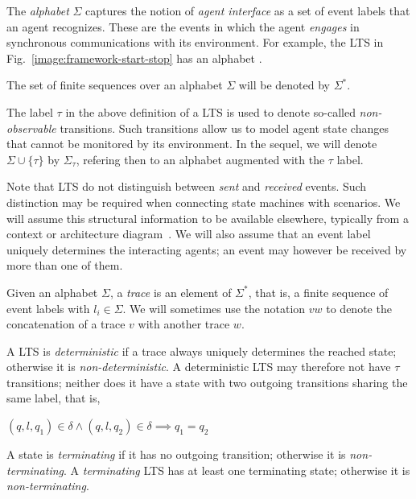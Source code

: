 The \emph{alphabet} $\Sigma$ captures the notion of \emph{agent interface} as a set of event labels that an agent recognizes. These are the events in which the agent \emph{engages} in synchronous communications with its environment. For example, the LTS in Fig.~\ref{image:framework-start-stop} has an alphabet . 

The set of finite sequences over an alphabet $\Sigma$ will be denoted by $\Sigma^{*}$.

The label $\tau$ in the above definition of a LTS is used to denote so-called \emph{non-observable} transitions. Such transitions allow us to model agent state changes that cannot be monitored by its environment. In the sequel, we will denote $\Sigma\cup\{\tau\}$ by $\Sigma_{\tau}$, refering then to an alphabet augmented with the $\tau$ label.

Note that LTS do not distinguish between \emph{sent} and \emph{received} events. Such distinction may be required when connecting state machines with scenarios. We will assume this structural information to be available elsewhere, typically from a context or architecture diagram~\cite{Ward:1985, Magee:1995}. We will also assume that an event label uniquely determines the interacting agents; an event may however be received by more than one of them. 

\begin{definition}[Trace]
Given an alphabet $\Sigma$, a \emph{trace} is an element of $\Sigma^{*}$, that is, a finite sequence of event labels  with $l_i \in \Sigma$. We will sometimes use the notation $vw$ to denote the concatenation of a trace $v$ with another trace $w$.
\end{definition}

\begin{definition}
A LTS is \emph{deterministic} if a trace always uniquely determines the reached state; otherwise it is \emph{non-deterministic}. A deterministic LTS may therefore not have $\tau$ transitions; neither does it have a state with two outgoing transitions sharing the same label, that is, 
\begin{center}$(q,l,q_1) \in \delta \wedge (q,l,q_2) \in \delta \implies q_1 = q_2$\end{center}
\end{definition}

\begin{definition}
A state is \emph{terminating} if it has no outgoing transition; otherwise it is \emph{non-terminating}. A \emph{terminating} LTS has at least one terminating state; otherwise it is \emph{non-terminating}.\label{definition:terminating-lts}
\end{definition}

